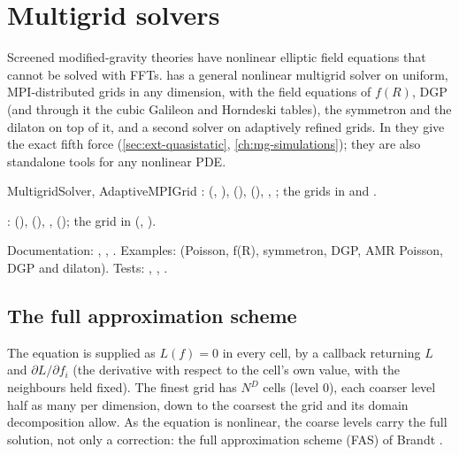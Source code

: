 \chapter{Multigrid solvers}\label{ch:multigrid}

Screened modified-gravity theories have nonlinear elliptic field equations that cannot be solved with FFTs. \fml{} has a
general nonlinear multigrid solver on uniform, MPI-distributed grids in any dimension, with the field equations of
$f(R)$, DGP (and through it the cubic Galileon and Horndeski tables), the symmetron and the dilaton on top of it, and a
second solver on adaptively refined grids. In  they give the exact fifth force
(\cref{sec:ext-quasistatic}, \cref{ch:mg-simulations}); they are also standalone tools for any nonlinear PDE.

\begin{modulebox}{MultigridSolver, AdaptiveMPIGrid}
:  (, ),
 (),  (), ,
; the grids in  and .\par
{}:  (), 
(), ,  (); the grid in  (,
).\par
Documentation: , ,
. Examples:  (Poisson, f(R), symmetron, DGP, AMR Poisson,
DGP and dilaton). Tests: , , .
\end{modulebox}

\section{The full approximation scheme}\label{sec:mg-fas}

The equation is supplied as $L(f)=0$ in every cell, by a callback returning $L$ and $\partial L/\partial f_i$ (the
derivative with respect to the cell's own value, with the neighbours held fixed). The finest grid has $N^D$ cells
(level 0), each coarser level half as many per dimension, down to the coarsest the grid and its domain decomposition
allow. As the equation is nonlinear, the coarse levels carry the full solution, not only a correction: the full
approximation scheme (FAS) of Brandt \cite{Brandt1977,Trottenberg2001}.

